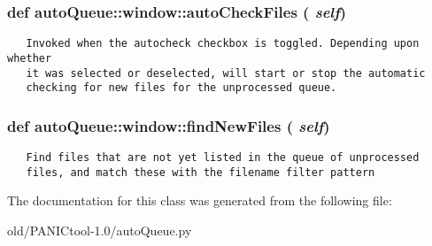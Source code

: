 \subsubsection{\setlength{\rightskip}{0pt plus 5cm}def auto\-Queue::window::auto\-Check\-Files ( {\em self})}\label{classautoQueue_1_1window_8753071d1a4953ca0a0bdc78c9a2b3f3}




\footnotesize\begin{verbatim}
   Invoked when the autocheck checkbox is toggled. Depending upon whether
   it was selected or deselected, will start or stop the automatic
   checking for new files for the unprocessed queue.
\end{verbatim}
\normalsize
\subsubsection{\setlength{\rightskip}{0pt plus 5cm}def auto\-Queue::window::find\-New\-Files ( {\em self})}\label{classautoQueue_1_1window_be4ca93befd0bd2e2805c61f8143c6d7}




\footnotesize\begin{verbatim}
   Find files that are not yet listed in the queue of unprocessed
   files, and match these with the filename filter pattern
\end{verbatim}
\normalsize
 

The documentation for this class was generated from the following file:\begin{CompactItemize}
\item 
old/PANICtool-1.0/auto\-Queue.py\end{CompactItemize}
